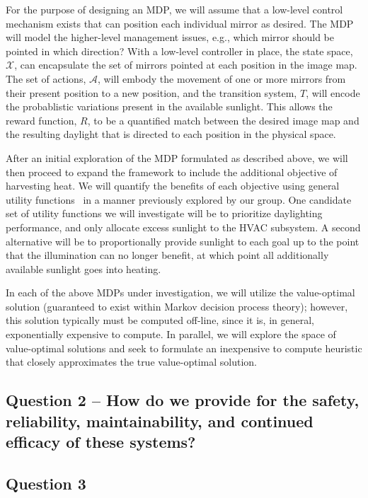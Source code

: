 For the purpose of designing an MDP, we will assume that a low-level
control mechanism exists that can position each individual mirror as
desired.  The MDP will model the higher-level management issues, e.g.,
which mirror should be pointed in which direction?
With a low-level controller in place, the state space, $\mathcal{X}$,
can encapsulate the set of mirrors pointed at each position in
the image map.  The set of actions, $\mathcal{A}$, will embody the movement
of one or more mirrors from their present position to a new position,
and the transition system, $T$, will encode the probablistic variations
present in the available sunlight.  This allows the reward function, $R$,
to be a quantified match between the desired image map and the resulting
daylight that is directed to each position in the physical space.

After an initial exploration of the MDP formulated as described above,
we will then proceed to expand the framework to include the additional
objective of harvesting heat.  We will quantify the benefits of each
objective using general utility functions~\cite{tggs10} in a manner previously
explored by our group. One candidate set of utility functions we will
investigate will be to prioritize daylighting performance, and only
allocate excess sunlight to the HVAC subsystem. A second alternative
will be to proportionally provide sunlight to each goal up to the point
that the illumination can no longer benefit, at which point all additionally
available sunlight goes into heating.

In each of the above MDPs under investigation, we will utilize the
value-optimal solution (guaranteed to exist within Markov decision process
theory); however, this solution typically must be computed off-line, since
it is, in general, exponentially expensive to compute.  In parallel, we
will explore the space of value-optimal solutions and seek to formulate
an inexpensive to compute heuristic that closely approximates the
true value-optimal solution.

\subsection{Question 2 -- How do we provide for the safety, reliability,
maintainability, and continued efficacy of these systems?}


\subsection{Question 3}


